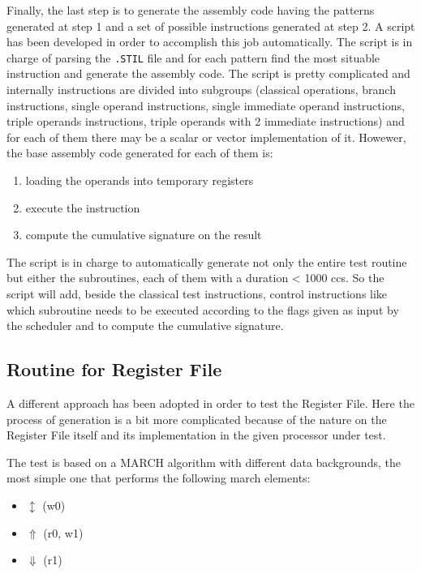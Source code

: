 \documentclass[paper=a4, fontsize=10pt]{scrartcl}	%
\begin{document}
	Finally, the last step is to generate the assembly code having the patterns generated at step 1 and a set of possible instructions generated at step 2. A script has been developed in order to accomplish this job automatically. The script is in charge of parsing the \texttt{.STIL} file and for each pattern find the most situable instruction and generate the assembly code. The script is pretty complicated and internally instructions are divided into subgroups (classical operations, branch instructions, single operand instructions, single immediate operand instructions, triple operands instructions, triple operands with 2 immediate instructions) and for each of them there may be a scalar or vector implementation of it. Howewer, the base assembly code generated for each of them is:
	\begin{enumerate}
		\itemsep0sp
		\item loading the operands into temporary registers
		\item execute the instruction
		\item compute the cumulative signature on the result
	\end{enumerate}

	The script is in charge to automatically generate not only the entire test routine but either the subroutines, each of them with a duration < 1000 ccs. So the script will add, beside the classical test instructions, control instructions like which subroutine needs to be executed according to the flags given as input by the scheduler and to compute the cumulative signature.

	\subsection{Routine for Register File}
	A different approach has been adopted in order to test the Register File. Here the process of generation is a bit more complicated because of the nature on the Register File itself and its implementation in the given processor under test.

	The test is based on a MARCH algorithm with different data backgrounds, the most simple one that performs the following march elements:

	\begin{itemize}
		\itemsep0sp
		\item $\updownarrow$ (w0)
		\item $\Uparrow$ (r0, w1)
		\item $\Downarrow$ (r1)
	\end{itemize}
\end{document}
